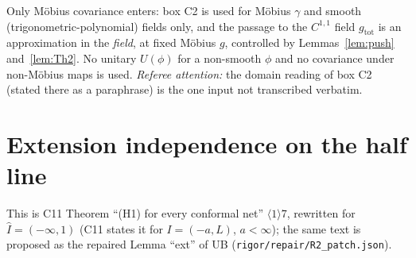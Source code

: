 \documentclass[11pt]{article}
\newcommand{\gtot}{g_{\mathrm{tot}}}
\begin{document}
\begin{verdictok}
Only Möbius covariance enters: box C2 is used for Möbius $\gamma$ and smooth (trigonometric-polynomial) fields only,
and the passage to the $C^{1,1}$ field $\gtot$ is an approximation in the \emph{field}, at fixed Möbius $g$, controlled by
Lemmas~\ref{lem:push} and~\ref{lem:Th2}.  No unitary $U(\phi)$ for a non-smooth $\phi$ and no covariance under
non-Möbius maps is used.  \emph{Referee attention:} the domain reading of box C2 (stated there as a paraphrase) is the
one input not transcribed verbatim.
\end{verdictok}

\section{Extension independence on the half line}\label{sec:ext}
This is C11 Theorem ``(H1) for every conformal net'' $\langle1\rangle7$, rewritten for $\widehat I=(-\infty,1)$ (C11 states it
for $I=(-a,L)$, $a<\infty$); the same text is proposed as the repaired Lemma ``ext'' of UB
(\texttt{rigor/repair/R2\_patch.json}).
\end{document}
